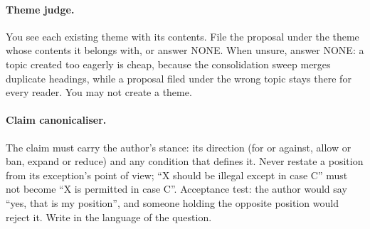 \documentclass{article}
\begin{document}
\paragraph{Theme judge.} You see each existing theme with its contents. File the proposal under the theme whose contents it belongs with, or answer NONE. When unsure, answer NONE: a topic created too eagerly is cheap, because the consolidation sweep merges duplicate headings, while a proposal filed under the wrong topic stays there for every reader. You may not create a theme.

\paragraph{Claim canonicaliser.} The claim must carry the author's stance: its direction (for or against, allow or ban, expand or reduce) and any condition that defines it. Never restate a position from its exception's point of view; ``X should be illegal except in case C'' must not become ``X is permitted in case C''. Acceptance test: the author would say ``yes, that is my position'', and someone holding the opposite position would reject it. Write in the language of the question.
\end{document}
